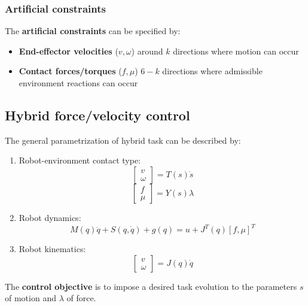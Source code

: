 \documentclass[a4paper,12pt]{article}
\begin{document}
\subsubsection{Artificial constraints}
The \textbf{artificial constraints} can be specified by:
\begin{itemize}
    \item \textbf{End-effector velocities} ($v,\omega$) 
    around $k$ directions where motion can occur 
    \item \textbf{Contact forces/torques} ($f,\mu$)
    $6-k$ directions where admissible environment reactions can occur
\end{itemize}
\subsection{Hybrid force/velocity control}
The general parametrization of hybrid task can be 
described by:\begin{enumerate}
    \item Robot-environment contact type:
    \begin{equation}
        \begin{bmatrix}
            v \\
            \omega
        \end{bmatrix}
        =T(s)\dot{s}
    \end{equation}
    \begin{equation}
        \begin{bmatrix}
            f \\
            \mu
        \end{bmatrix}
        =Y(s)\lambda
    \end{equation}
    \item Robot dynamics: \begin{equation} \label{eq:robot dynamics in hybrid control}
    M(q)\ddot{q}+S(q,\dot{q})+g(q)=u+J^T(q)[f,\mu]^T
    \end{equation}
    \item Robot kinematics:\begin{equation}
    \begin{bmatrix}
        v\\
        \omega
    \end{bmatrix}=J(q)\dot{q}
    \end{equation}
\end{enumerate}
The \textbf{control objective} is to impose a desired task evolution 
to the parameters $s$ of motion and $\lambda$ of force.\\
\end{document}
